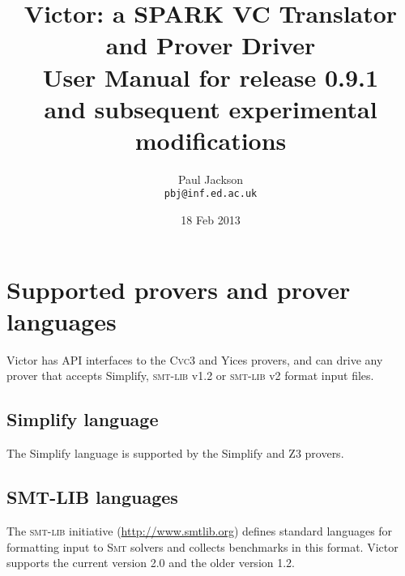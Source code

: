 \documentclass[12pt,fleqn]{article}
\title{Victor: a SPARK VC Translator and Prover Driver \\[4ex]
  \Large
  User Manual for release 0.9.1 \\
  and subsequent experimental modifications \\[1ex]
}
\author{Paul Jackson \\
        \texttt{pbj@inf.ed.ac.uk}}
\date{18 Feb 2013}
\newcommand{\cvcthree}{\textsc{Cvc}3}
\newcommand{\zthree}{\textsc{Z}3}
\newcommand{\yices}{Yices}
\newcommand{\smt}{\textsc{Smt}}
\newcommand{\smtlib}{\textsc{smt-lib}}
\begin{document}
\maketitle


\tableofcontents


\setlength{\parskip}{0.8\baselineskip}


\section{Supported provers and prover languages}

Victor has API interfaces to the \cvcthree{} and \yices{} provers, and
can drive any prover that accepts Simplify, \smtlib{} v1.2 or
\smtlib{} v2 format input files.

\subsection{Simplify language}

The Simplify language is supported by the Simplify and \zthree{} provers.

\subsection{SMT-LIB languages}

The \smtlib{} initiative (\url{http://www.smtlib.org}) defines
standard languages for formatting input to \smt{} solvers and collects
benchmarks in this format. Victor supports the current version 2.0
and the older version 1.2.
\end{document}

